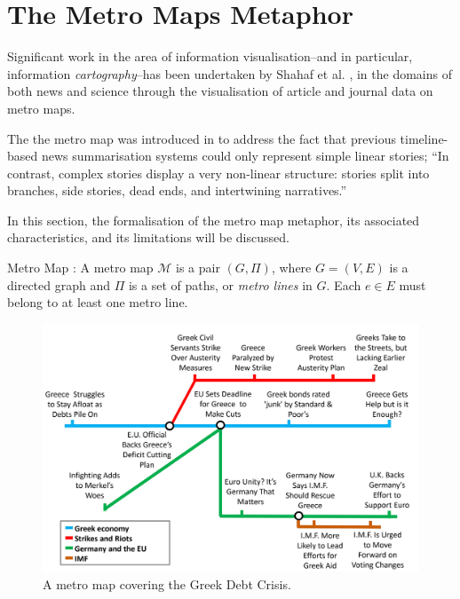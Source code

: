 
\section{The Metro Maps Metaphor}
Significant work in the area of information visualisation--and in particular, information \textit{cartography}--has been undertaken by Shahaf et al. \citep{ConnectingTheDots, GeneratingInformationMaps, MetroMapsOfScience, InformationCartographyPre}, in the domains of both news and science through the visualisation of article and journal data on metro maps.

The the metro map was introduced in \citep{GeneratingInformationMaps} to address the fact that previous timeline-based news summarisation systems could only represent simple linear stories; ``In contrast, complex stories display a very non-linear structure: stories split into branches, side stories, dead ends, and intertwining narratives.'' \citep[p.1]{InformationCartographyPre}

In this section, the formalisation of the metro map metaphor, its associated characteristics, and its limitations will be discussed.

\begin{definition}{Metro Map \citep{GeneratingInformationMaps}:}
A metro map $\mathcal{M}$ is a pair $(G, \Pi)$, where $G=(V, E)$ is a directed graph and $\Pi$ is a set of paths, or \textit{metro lines} in $G$. Each $e \in E$ must belong to at least one metro line.
\end{definition}

\begin{figure}[htbp!]
	\centering
	\includegraphics[width=.9\textwidth]{img/lit-survey/greece-metromap.jpg}
	\caption{A metro map \citep{GeneratingInformationMaps} covering the Greek Debt Crisis.}
	\label{fig:greecemetro}
\end{figure}

